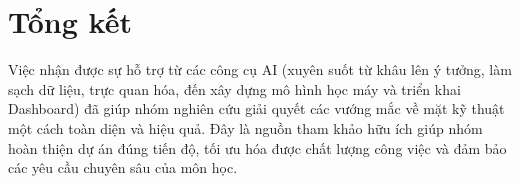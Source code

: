 \documentclass[12pt, a4paper]{article}
\begin{document}
\section{Tổng kết}
Việc nhận được sự hỗ trợ từ các công cụ AI (xuyên suốt từ khâu lên ý tưởng, làm sạch dữ liệu, trực quan hóa, đến xây dựng mô hình học máy và triển khai Dashboard) đã giúp nhóm nghiên cứu giải quyết các vướng mắc về mặt kỹ thuật một cách toàn diện và hiệu quả. Đây là nguồn tham khảo hữu ích giúp nhóm hoàn thiện dự án đúng tiến độ, tối ưu hóa được chất lượng công việc và đảm bảo các yêu cầu chuyên sâu của môn học.
\end{document}
